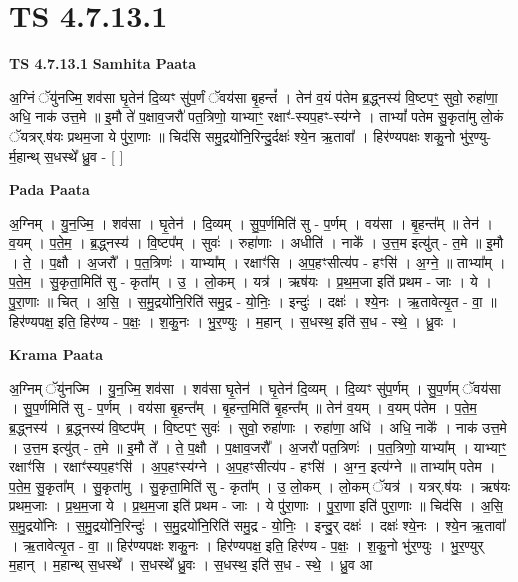 \documentclass[17pt]{extarticle}
\begin{document}
\section{ TS 4.7.13.1 }

\textbf{TS 4.7.13.1 } \newline
\textbf{Samhita Paata} \newline

अ॒ग्निं ॅयु॑नज्मि॒ शव॑सा घृ॒तेन॑ दि॒व्यꣳ सु॑प॒र्णं ॅवय॑सा बृ॒हन्तं᳚ । तेन॑ व॒यं प॑तेम ब्र॒द्ध्नस्य॑ वि॒ष्टपꣳ॒॒ सुवो॒ रुहा॑णा॒ अधि॒ नाक॑ उत्त॒मे ॥ इ॒मौ ते॑ प॒क्षाव॒जरौ॑ पत॒त्रिणो॒ याभ्याꣳ॒॒ रक्षाꣳ॑-स्यप॒हꣳ-स्य॑ग्ने । ताभ्यां᳚ पतेम सु॒कृता॑मु लो॒कं ॅयत्रर्.ष॑यः प्रथम॒जा ये पु॑रा॒णाः ॥ चिद॑सि समु॒द्रयो॑नि॒रिन्दु॒र्दक्षः॑ श्ये॒न ऋ॒तावा᳚ । हिर॑ण्यपक्षः शकु॒नो भु॑र॒ण्यु-र्म॒हान्थ् स॒धस्थे᳚ ध्रु॒व - [  ] \newline

\textbf{Pada Paata} \newline

अ॒ग्निम् । यु॒न॒ज्मि॒ । शव॑सा । घृ॒तेन॑ । दि॒व्यम् । सु॒प॒र्णमिति॑ सु - प॒र्णम् । वय॑सा । बृ॒हन्त᳚म् ॥ तेन॑ । व॒यम् । प॒ते॒म॒ । ब्र॒द्ध्नस्य॑ । वि॒ष्टप᳚म् । सुवः॑ । रुहा॑णाः । अधीति॑ । नाके᳚ । उ॒त्त॒म इत्यु॑त् - त॒मे ॥ इ॒मौ । ते॒ । प॒क्षौ । अ॒जरौ᳚ । प॒त॒त्रिणः॑ । याभ्या᳚म् । रक्षाꣳ॑सि । अ॒प॒हꣳसीत्य॑प - हꣳसि॑ । अ॒ग्ने॒ ॥ ताभ्या᳚म् । प॒ते॒म॒ । सु॒कृता॒मिति॑ सु - कृता᳚म् । उ॒ । लो॒कम् । यत्र॑ । ऋष॑यः । प्र॒थ॒म॒जा इति॑ प्रथम - जाः । ये । पु॒रा॒णाः ॥ चित् । अ॒सि॒ । स॒मु॒द्रयो॑नि॒रिति॑ समु॒द्र - यो॒निः॒ । इन्दुः॑ । दक्षः॑ । श्ये॒नः । ऋ॒तावेत्यृ॒त - वा॒ ॥ हिर॑ण्यपक्ष॒ इति॒ हिर॑ण्य - प॒क्षः॒ । श॒कु॒नः । भु॒र॒ण्युः । म॒हान् । स॒धस्थ॒ इति॑ स॒ध - स्थे॒ । ध्रु॒वः ।  \newline


\textbf{Krama Paata} \newline

अ॒ग्निम् ॅयु॑नज्मि । यु॒न॒ज्मि॒ शव॑सा । शव॑सा घृ॒तेन॑ । घृ॒तेन॑ दि॒व्यम् । दि॒व्यꣳ सु॑प॒र्णम् । सु॒प॒र्णम् ॅवय॑सा । सु॒प॒र्णमिति॑ सु - प॒र्णम् । वय॑सा बृ॒हन्त᳚म् । बृ॒हन्त॒मिति॑ बृ॒हन्त᳚म् ॥ तेन॑ व॒यम् । व॒यम् प॑तेम । प॒ते॒म॒ ब्र॒द्ध्नस्य॑ । ब्र॒द्ध्नस्य॑ वि॒ष्टप᳚म् । वि॒ष्टपꣳ॒॒ सुवः॑ । सुवो॒ रुहा॑णाः । रुहा॑णा॒ अधि॑ । अधि॒ नाके᳚ । नाक॑ उत्त॒मे । उ॒त्त॒म इत्यु॑त् - त॒मे ॥ इ॒मौ ते᳚ । ते॒ प॒क्षौ । प॒क्षाव॒जरौ᳚ । अ॒जरौ॑ पत॒त्रिणः॑ । प॒त॒त्रिणो॒ याभ्या᳚म् । याभ्याꣳ॒॒ रक्षाꣳ॑सि । रक्षाꣳ॑स्यप॒हꣳसि॑ । अ॒प॒हꣳस्य॑ग्ने । अ॒प॒हꣳसीत्य॑प - हꣳसि॑ । अ॒ग्न॒ इत्य॑ग्ने ॥ ताभ्या᳚म् पतेम । प॒ते॒म॒ सु॒कृता᳚म् । सु॒कृता॑मु । सु॒कृता॒मिति॑ सु - कृता᳚म् । उ॒ लो॒कम् । लो॒कम् ॅयत्र॑ । यत्रर्.ष॑यः । ऋष॑यः प्रथम॒जाः । प्र॒थ॒म॒जा ये । प्र॒थ॒म॒जा इति॑ प्रथम - जाः । ये पु॑रा॒णाः । पु॒रा॒णा इति॑ पुरा॒णाः ॥ चिद॑सि । अ॒सि॒ स॒मु॒द्रयो॑निः । स॒मु॒द्रयो॑नि॒रिन्दुः॑ । स॒मु॒द्रयो॑नि॒रिति॑ समु॒द्र - यो॒निः॒ । इन्दु॒र् दक्षः॑ । दक्षः॑ श्ये॒नः । श्ये॒न ऋ॒तावा᳚ । ऋ॒तावेत्यृ॒त - वा॒ ॥ हिर॑ण्यपक्षः शकु॒नः । हिर॑ण्यपक्ष॒ इति॒ हिर॑ण्य - प॒क्षः॒ । श॒कु॒नो भु॑र॒ण्युः । भु॒र॒ण्युर् म॒हान् । म॒हान्थ् स॒धस्थे᳚ । स॒धस्थे᳚ ध्रु॒वः । स॒धस्थ॒ इति॑ स॒ध - स्थे॒ । ध्रु॒व आ \newline
\end{document}
